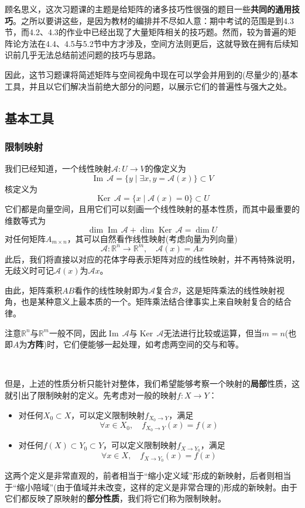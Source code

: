 \documentclass[a4paper,UTF8,fontset=windows]{ctexart}
\DeclareMathOperator{\im}{Im\,}
\DeclareMathOperator{\Ker}{Ker\,}
\newcommand*{\ma}{\mathcal{A}}
\newcommand*{\note}{\noindent *}
\begin{document}
顾名思义，这次习题课的主题是给矩阵的诸多技巧性很强的题目一些\textbf{共同的通用技巧}。之所以要讲这些，是因为教材的编排并不尽如人意：期中考试的范围是到4.3节，而4.2、4.3的作业中已经出现了大量矩阵相关的技巧题。然而，较为普遍的矩阵论方法在4.4、4.5与5.2节中方才涉及，空间方法则更后，这就导致在拥有后续知识前几乎无法总结前述问题的技巧与思路。

因此，这节习题课将简述矩阵与空间视角中现在可以学会并用到的(尽量少的)基本工具，并且以它们解决当前绝大部分的问题，以展示它们的普遍性与强大之处。

\subsection{基本工具}
\subsubsection{限制映射}
我们已经知道，一个线性映射$\ma:U\to V$的像定义为
$$\im\ma=\{y\mid\exists x,y=\ma(x)\}\subset V$$
核定义为
$$\Ker\ma=\{x\mid\ma(x)=0\}\subset U$$
它们都是向量空间，且用它们可以刻画一个线性映射的基本性质，而其中最重要的维数等式为
$$\dim\im\ma+\dim\Ker\ma=\dim U$$
对任何矩阵$A_{m\times n}$，其可以自然看作线性映射(考虑向量为列向量)
$$\ma:\mathbb{R}^n\to\mathbb{R}^m,\quad\mathcal{A}(x)=Ax$$
此后，我们将直接以对应的花体字母表示矩阵对应的线性映射，并不再特殊说明，无歧义时可记$\ma(x)$为$\ma x$。

\note 由此，矩阵乘积$AB$看作的线性映射即为$\mathcal{A}$复合$\mathcal{B}$，这是矩阵乘法的线性映射视角，也是某种意义上最本质的一个。矩阵乘法结合律事实上来自映射复合的结合律。

\note 注意$\mathbb{R}^n$与$\mathbb{R}^m$一般不同，因此$\im\ma$与$\Ker\ma$无法进行比较或运算，但当$m=n$(也即$A$为\textbf{方阵})时，它们便能够一起处理，如考虑两空间的交与和等。

\

但是，上述的性质分析只能针对整体，我们希望能够考察一个映射的\textbf{局部}性质，这就引出了限制映射的定义。先考虑对一般的映射$f:X\to Y$：
\begin{itemize}
    \item 对任何$X_0\subset X$，可以定义限制映射$f_{X_0\to Y}$，满足
    $$\forall x\in X_0,\quad f_{X_0\to Y}(x)=f(x)$$
    \item 对任何$f(X)\subset Y_0\subset Y$，可以定义限制映射$f_{X\to Y_0}$，满足
    $$\forall x\in X,\quad f_{X\to Y_0}(x)=f(x)$$
\end{itemize}

这两个定义是非常直观的，前者相当于``缩小定义域''形成的新映射，后者则相当于``缩小陪域''(由于值域并未改变，这样的定义是非常合理的)形成的新映射。由于它们都反映了原映射的\textbf{部分性质}，我们将它们称为限制映射。
\end{document}
